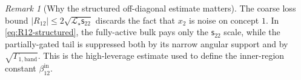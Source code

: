 \documentclass{article} %
\theoremstyle{plain}
\theoremstyle{definition}
\theoremstyle{remark}
\newtheorem{remark}[theorem]{Remark}
\begin{document}
\begin{remark}[Why the structured off-diagonal estimate matters]
The coarse loss bound
$|R_{12}|\le2\sqrt{\mathcal L_\star\mathsf s_{22}}$ discards the fact that
$x_2$ is noise on concept $1$.  In \eqref{eq:R12-structured}, the fully-active
bulk pays only the $\mathsf s_{22}$ scale, while the partially-gated tail is
suppressed both by its narrow angular support and by
$\sqrt{\Gamma_{1,\mathrm{band}}}$.  This is the high-leverage estimate used
to define the inner-region constant $\beta_{12}^{\mathrm{in}}$.
\end{remark}

\end{document}
